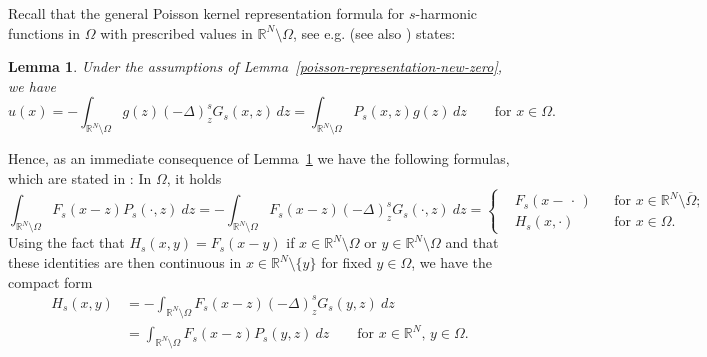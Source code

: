 \documentclass[notitlepage,11pt,reqno]{amsart}
\newtheorem{lemma}[theorem]{Lemma}
\theoremstyle{definition}
\numberwithin{equation}{section}
\newcommand{\RR}{\mathds{R}}
\begin{document}
Recall that the general Poisson kernel representation formula for $s$-harmonic functions in $\Omega$ with prescribed values in $\RR^N \setminus \Omega$, see e.g. \cite[Theorem 1.2.3 and Lemma 3.1.2)]{nicola} (see also \cite{B99,BKK08}) states:

\begin{lemma}
\label{poisson-representation-new}
Under the assumptions of Lemma~\ref{poisson-representation-new-zero}, we have 
$$
u(x)= -\int_{\RR^N\setminus \Omega}g(z) (-\Delta)^s_z G_s(x,z)\,dz=\int_{\RR^N\setminus \Omega} P_s(x,z)g(z)\, dz \qquad \text{for $x \in \Omega$.}
$$
\end{lemma}

Hence, as an immediate consequence of Lemma~\ref{poisson-representation-new} we have the following formulas, which are stated in \cite[Lemma 3.2.vi)]{nicola}: In $\Omega$, it holds
$$
\int_{\RR^N\setminus \Omega}F_s(x-z) P_s(\cdot,z)\ dz
=-\int_{\RR^N\setminus \Omega}F_s(x-z) (-\Delta)^s_z G_s(\cdot ,z)\ dz=\left\{\begin{aligned} &F_s(x- \,\cdot\,) && \text{for $x \in \RR^N \setminus \overline{\Omega}$;}\\
&H_s(x,\cdot) &&\text{for $x \in \Omega$.}
\end{aligned}\right.
$$
Using the fact that $H_s(x,y)= F_s(x-y)$ if $x \in \RR^N \setminus \Omega$ or $y \in \RR^N \setminus \Omega$ and that these identities are then continuous in $x\in \RR^N\setminus\{y\}$ for fixed $y\in \Omega$, we have the compact form 
\begin{equation*}
  \label{eq:splitting-prelim-2}
  \begin{split}
H_s(x,y)&=-\int_{\RR^N\setminus \Omega}F_s(x-z)(-\Delta)^s_z G_s(y,z)\ dz\\
&=\int_{\RR^N\setminus \Omega}F_s(x-z)P_s(y,z)\ dz\qquad \text{for $x \in \RR^N$, $y \in \Omega$.}
\end{split}
\end{equation*}
\end{document}
